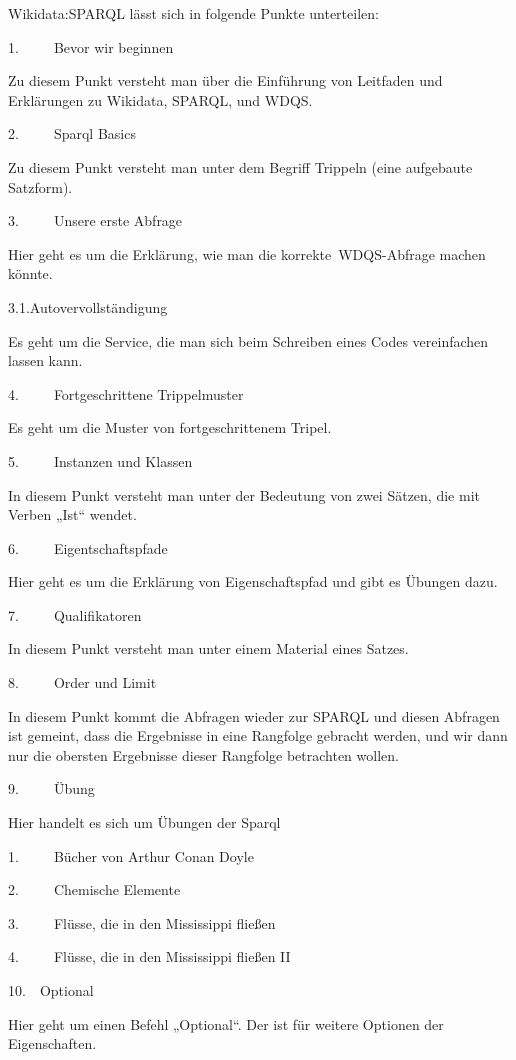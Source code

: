 \documentclass{article}
\begin{document}
Wikidata:SPARQL \autocite{wikidata_wikidatasparql_nodate} lässt sich in folgende Punkte unterteilen:


1.     Bevor wir beginnen 


Zu diesem Punkt versteht man über die Einführung von Leitfaden und Erklärungen zu Wikidata, SPARQL, und WDQS.


2.     Sparql Basics


Zu diesem Punkt versteht man unter dem Begriff Trippeln (eine aufgebaute Satzform). 


3.     Unsere erste Abfrage


Hier geht es um die Erklärung, wie man die korrekte WDQS-Abfrage machen könnte. 


3.1.Autovervollständigung


Es geht um die Service, die man sich beim Schreiben eines Codes vereinfachen lassen kann.


4.     Fortgeschrittene Trippelmuster


Es geht um die Muster von fortgeschrittenem Tripel.


5.     Instanzen und Klassen


In diesem Punkt versteht man unter der Bedeutung von zwei Sätzen, die mit Verben „Ist“ wendet. 


6.     Eigentschaftspfade


Hier geht es um die Erklärung von Eigenschaftspfad und gibt es Übungen dazu.


7.     Qualifikatoren


In diesem Punkt versteht man unter einem Material eines Satzes.


8.     Order und Limit


In diesem Punkt kommt die Abfragen wieder zur SPARQL und diesen Abfragen ist gemeint, dass die Ergebnisse in eine Rangfolge gebracht werden, und wir dann nur die obersten Ergebnisse dieser Rangfolge betrachten wollen.


9.     Übung


Hier handelt es sich um Übungen der Sparql


1.     Bücher von Arthur Conan Doyle


2.     Chemische Elemente


3.     Flüsse, die in den Mississippi fließen


4.     Flüsse, die in den Mississippi fließen II


10.  Optional


Hier geht um einen Befehl „Optional“. Der ist für weitere Optionen der Eigenschaften.
\end{document}
